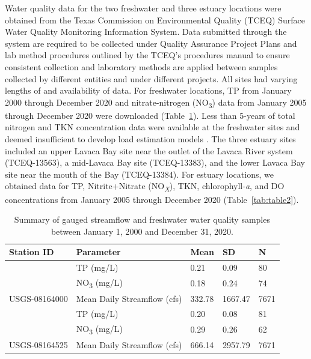 \documentclass[fleqn,10pt,lineno]{wlpeerj} %
\begin{document}
Water quality data for the two freshwater and three estuary locations
were obtained from the Texas Commission on Environmental Quality (TCEQ)
Surface Water Quality Monitoring Information System. Data submitted
through the system are required to be collected under Quality Assurance
Project Plans and lab method procedures outlined by the TCEQ's
procedures manual to ensure consistent collection and laboratory methods
are applied between samples collected by different entities and under
different projects. All sites had varying lengths of and availability of
data. For freshwater locations, TP from January 2000 through December
2020 and nitrate-nitrogen (NO\textsubscript{3}) data from January 2005
through December 2020 were downloaded (Table~\ref{tab:table1}). Less
than 5-years of total nitrogen and TKN concentration data were available
at the freshwater sites and deemed insufficient to develop load
estimation models
\autocite{horowitzEvaluationSedimentRating2003,snelderEstimationCatchmentNutrient2017}.
The three estuary sites included an upper Lavaca Bay site near the
outlet of the Lavaca River system (TCEQ-13563), a mid-Lavaca Bay site
(TCEQ-13383), and the lower Lavaca Bay site near the mouth of the Bay
(TCEQ-13384). For estuary locations, we obtained data for TP,
Nitrite+Nitrate (NO\textsubscript{\emph{X}}), TKN, chlorophyll-\emph{a},
and DO concentrations from January 2005 through December 2020
(Table~\ref{tab:table2}).

\begin{table}

\caption{\label{tab:table1}Summary of gauged streamflow and freshwater water quality samples between January 1, 2000 and December 31, 2020.}
\centering
\begin{tabular}[t]{lllll}
\toprule
Station ID & Parameter & Mean & SD & N\\
\midrule
 & TP (mg/L) & 0.21 & 0.09 & 80\\

 & NO\textsubscript{3} (mg/L) & 0.18 & 0.24 & 74\\

\multirow{-3}{*}{\raggedright\arraybackslash USGS-08164000} & Mean Daily Streamflow (cfs) & 332.78 & 1667.47 & 7671\\
\cmidrule{1-5}
 & TP (mg/L) & 0.20 & 0.08 & 81\\

 & NO\textsubscript{3} (mg/L) & 0.29 & 0.26 & 62\\

\multirow{-3}{*}{\raggedright\arraybackslash USGS-08164525} & Mean Daily Streamflow (cfs) & 666.14 & 2957.79 & 7671\\
\bottomrule
\end{tabular}
\end{table}
\end{document}
